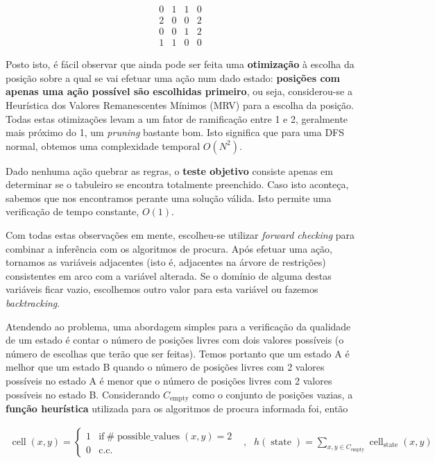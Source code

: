 \documentclass[12pt,a4paper]{article}
\newcommand{\op}{\operatorname}
\begin{document}
\[
  \begin{array}{cccc}
    0 & 1 & 1 & 0 \\
    2 & 0 & 0 & 2 \\
    0 & 0 & 1 & 2 \\
    1 & 1 & 0 & 0
  \end{array}
\]

Posto isto, é fácil observar que ainda pode ser feita uma \textbf{otimização} à escolha da
posição sobre a qual se vai efetuar uma ação num dado estado:
\textbf{posições com apenas uma ação possível são escolhidas primeiro},
ou seja, considerou-se a Heurística dos Valores Remanescentes Mínimos (MRV) para
a escolha da posição.
Todas estas otimizações levam a um fator de ramificação entre 1 e 2,
geralmente mais próximo do 1, um \textit{pruning} bastante bom.
Isto significa que para uma DFS normal, obtemos uma complexidade temporal \(O(N^2)\).

Dado nenhuma ação quebrar as regras, o \textbf{teste objetivo} consiste apenas em determinar
se o tabuleiro se encontra totalmente preenchido. Caso isto aconteça, sabemos que
nos encontramos perante uma solução válida. Isto permite uma verificação de tempo constante, \(O(1)\).

Com todas estas observações em mente, escolheu-se utilizar \textit{forward checking} para combinar
a inferência com os algoritmos de procura. Após efetuar uma ação, tornamos as variáveis
adjacentes (isto é, adjacentes na árvore de restrições) consistentes em arco com a variável alterada.
Se o domínio de alguma destas variáveis ficar vazio, escolhemos outro valor para esta variável ou
fazemos \textit{backtracking}.

Atendendo ao problema, uma abordagem simples para a verificação da qualidade de
um estado é contar o número de posições livres com dois valores possíveis
(o número de escolhas que terão que ser feitas).
Temos portanto que um estado A é melhor que um estado B quando
o número de posições livres com 2 valores possíveis no estado A é menor que
o número de posições livres com 2 valores possíveis no estado B.
Considerando \(C_{\op{empty}}\) como o conjunto de posições vazias, a
\textbf{função heurística} utilizada para os algoritmos de procura informada foi, então

\[
  \begin{aligned}
    \op{cell}(x, y) = \begin{cases}
                        1 & \text{if}~\#\op{possible\_values}(x, y) = 2 \\
                        0 & \text{c.c.}
                      \end{cases}
     & , &
    h(\op{state}) = \sum_{x,y\in C_{\op{empty}}} \op{cell}_{\op{state}}(x, y)
  \end{aligned}
\]
\end{document}
